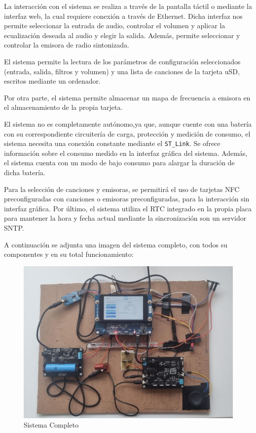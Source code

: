 La interacción con el sistema se realiza a través de la pantalla táctil o mediante la interfaz web, la cual requiere conexión a través de Ethernet. Dicha interfaz nos permite seleccionar la entrada de audio, controlar el volumen y aplicar la ecualización deseada al audio y elegir la salida. Además, permite seleccionar y controlar la emisora de radio sintonizada.

El sistema permite la lectura de los parámetros de configuración seleccionados (entrada, salida, filtros y volumen) y una lista de canciones de la tarjeta uSD, escritos mediante un ordenador.

Por otra parte, el sistema permite almacenar un mapa de frecuencia a emisora en el almacenamiento de la propia tarjeta.

El sistema no es completamente autónomo,ya que, aunque cuente con una batería con su correspondiente circuitería de carga, protección y medición de consumo, el sistema necesita una conexión constante mediante el \texttt{ST\_Link}. Se ofrece información sobre el consumo medido en la interfaz gráfica del sistema. Además, el sistema cuenta con un modo de bajo consumo para alargar la duración de dicha batería.

Para la selección de canciones y emisoras, se permitirá el uso de tarjetas NFC preconfiguradas con canciones o emisoras preconfiguradas, para la interacción sin interfaz gráfica. Por último, el sistema utiliza el RTC integrado en la propia placa para mantener la hora y fecha actual mediante la sincronización son un servidor SNTP.

A continuación se adjunta una imagen del sistema completo, con todos su componentes y en su total funcionamiento:

\begin{figure}[!hp]
    \centering
    \includegraphics[width=\textwidth]{images/1/Foto_Sistema.jpg}
    \caption{Sistema Completo}
    \label{fig:1-Sistema_Completo}
\end{figure}